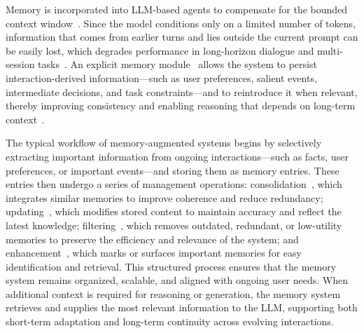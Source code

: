 Memory is incorporated into LLM-based agents to compensate for the bounded context window~\cite{liu2024lost,maharana2024locomo, hsieh2024ruler}. Since the model conditions only on a limited number of tokens, information that comes from earlier turns and lies outside the current prompt can be easily lost, which degrades performance in long-horizon dialogue and multi-session tasks~\cite{ shaham-etal-2023-zeroscrolls, wu2025longmemeval, xu-etal-2022-beyond}. An explicit memory module~\cite{park2023generativeagents, packer2023memgpt, sumers2024cognitive, graves2016hybrid, bai-etal-2024-longbench} allows the system to persist interaction-derived information—such as user preferences, salient events, intermediate decisions, and task constraints—and to reintroduce it when relevant, thereby improving consistency and enabling reasoning that depends on long-term context~\cite{park2023generativeagents, graves2016hybrid}.

The typical workflow of memory-augmented systems begins by selectively extracting important information from ongoing interactions—such as facts, user preferences, or important events—and storing them as memory entries. These entries then undergo a series of management operations: consolidation~\cite{zhong2024memorybank, du2025rethinkingmemoryllmbased,10.5120/ijca2026926236}, which integrates similar memories to improve coherence and reduce redundancy; updating~\cite{hu2023chatdbaugmentingllmsdatabases, packer2023memgpt, liu2025dynamem}, which modifies stored content to maintain accuracy and reflect the latest knowledge; filtering~\cite{zhong2024memorybank,park2023generativeagents,li-etal-2023-compressing}, which removes outdated, redundant, or low-utility memories to preserve the efficiency and relevance of the system; and enhancement~\cite{hu-etal-2025-hiagent,sun-etal-2026-h}, which marks or surfaces important memories for easy identification and retrieval. This structured process ensures that the memory system remains organized, scalable, and aligned with ongoing user needs. When additional context is required for reasoning or generation, the memory system retrieves and supplies the most relevant information to the LLM, supporting both short-term adaptation and long-term continuity across evolving interactions. 

